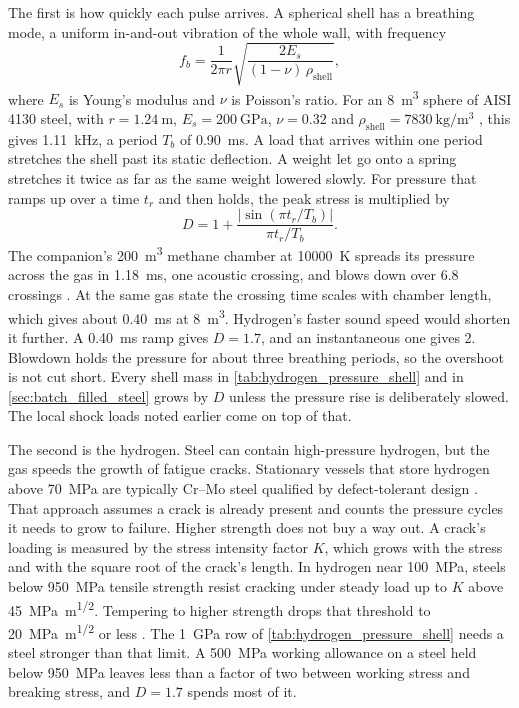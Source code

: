 \documentclass{article}
\begin{document}
The first is how quickly each pulse arrives. A spherical shell has a breathing mode, a uniform in-and-out vibration of the whole wall, with frequency
\begin{equation}\label{eq:sphere_breathing}
    f_b = \frac{1}{2\pi r}\sqrt{\frac{2E_s}{(1-\nu)\,\rho_{\mathrm{shell}}}},
\end{equation}
where $E_s$ is Young's modulus and $\nu$ is Poisson's ratio. For an \SI{8}{\cubic\meter} sphere of AISI 4130 steel, with $r=\SI{1.24}{\meter}$, $E_s=\SI{200}{\giga\pascal}$, $\nu=0.32$ and $\rho_{\mathrm{shell}}=\SI{7830}{\kilogram\per\cubic\meter}$ \cite{mil_hdbk_5j}, this gives \SI{1.11}{\kilo\hertz}, a period $T_b$ of \SI{0.90}{\milli\second}. A load that arrives within one period stretches the shell past its static deflection. A weight let go onto a spring stretches it twice as far as the same weight lowered slowly. For pressure that ramps up over a time $t_r$ and then holds, the peak stress is multiplied by
\begin{equation}\label{eq:ramp_dlf}
    D = 1 + \frac{\left|\sin(\pi t_r/T_b)\right|}{\pi t_r/T_b}.
\end{equation}
The companion's \SI{200}{\cubic\meter} methane chamber at \SI{10000}{\kelvin} spreads its pressure across the gas in \SI{1.18}{\milli\second}, one acoustic crossing, and blows down over 6.8 crossings \cite{Katz_puffsat_impact_sim_2026}. At the same gas state the crossing time scales with chamber length, which gives about \SI{0.40}{\milli\second} at \SI{8}{\cubic\meter}. Hydrogen's faster sound speed would shorten it further. A \SI{0.40}{\milli\second} ramp gives $D=1.7$, and an instantaneous one gives 2. Blowdown holds the pressure for about three breathing periods, so the overshoot is not cut short. Every shell mass in \autoref{tab:hydrogen_pressure_shell} and in \autoref{sec:batch_filled_steel} grows by $D$ unless the pressure rise is deliberately slowed. The local shock loads noted earlier come on top of that.

The second is the hydrogen. Steel can contain high-pressure hydrogen, but the gas speeds the growth of fatigue cracks. Stationary vessels that store hydrogen above \SI{70}{\mega\pascal} are typically Cr--Mo steel qualified by defect-tolerant design \cite{sanmarchi2017_thickwall}. That approach assumes a crack is already present and counts the pressure cycles it needs to grow to failure. Higher strength does not buy a way out. A crack's loading is measured by the stress intensity factor $K$, which grows with the stress and with the square root of the crack's length. In hydrogen near \SI{100}{\mega\pascal}, steels below \SI{950}{\mega\pascal} tensile strength resist cracking under steady load up to $K$ above \SI{45}{\mega\pascal\meter\tothe{1/2}}. Tempering to higher strength drops that threshold to \SI{20}{\mega\pascal\meter\tothe{1/2}} or less \cite{sanmarchi2017_thickwall}. The \SI{1}{\giga\pascal} row of \autoref{tab:hydrogen_pressure_shell} needs a steel stronger than that limit. A \SI{500}{\mega\pascal} working allowance on a steel held below \SI{950}{\mega\pascal} leaves less than a factor of two between working stress and breaking stress, and $D=1.7$ spends most of it.
\end{document}
